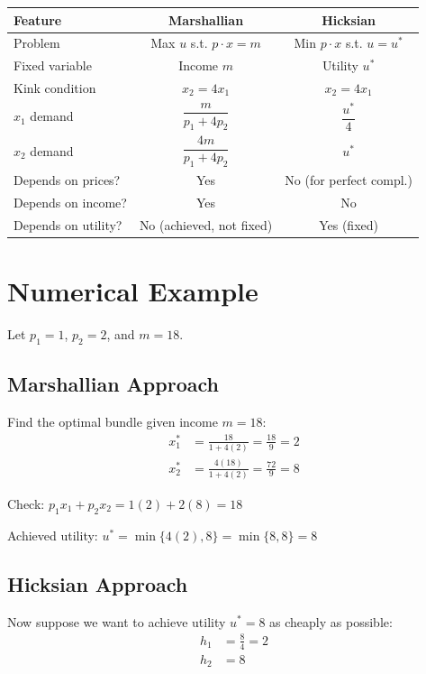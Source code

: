 \documentclass[11pt]{article}
\begin{document}
\begin{center}
\begin{tabular}{|l|c|c|}
\hline
\textbf{Feature} & \textbf{Marshallian} & \textbf{Hicksian} \\
\hline
Problem & Max $u$ s.t. $p \cdot x = m$ & Min $p \cdot x$ s.t. $u = u^*$ \\
\hline
Fixed variable & Income $m$ & Utility $u^*$ \\
\hline
Kink condition & $x_2 = 4x_1$ & $x_2 = 4x_1$ \\
\hline
$x_1$ demand & $\dfrac{m}{p_1 + 4p_2}$ & $\dfrac{u^*}{4}$ \\
\hline
$x_2$ demand & $\dfrac{4m}{p_1 + 4p_2}$ & $u^*$ \\
\hline
Depends on prices? & Yes & No (for perfect compl.) \\
\hline
Depends on income? & Yes & No \\
\hline
Depends on utility? & No (achieved, not fixed) & Yes (fixed) \\
\hline
\end{tabular}
\end{center}

\section{Numerical Example}

Let $p_1 = 1$, $p_2 = 2$, and $m = 18$.

\subsection{Marshallian Approach}

Find the optimal bundle given income $m = 18$:
\begin{align*}
x_1^* &= \frac{18}{1 + 4(2)} = \frac{18}{9} = 2 \\
x_2^* &= \frac{4(18)}{1 + 4(2)} = \frac{72}{9} = 8
\end{align*}

Check: $p_1 x_1 + p_2 x_2 = 1(2) + 2(8) = 18$ \checkmark

Achieved utility: $u^* = \min\{4(2), 8\} = \min\{8, 8\} = 8$

\subsection{Hicksian Approach}

Now suppose we want to achieve utility $u^* = 8$ as cheaply as possible:
\begin{align*}
h_1 &= \frac{8}{4} = 2 \\
h_2 &= 8
\end{align*}
\end{document}
